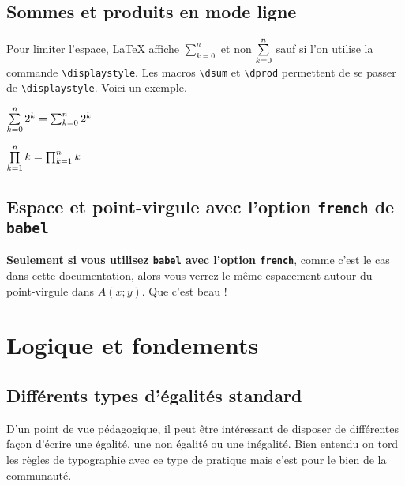 \documentclass[12pt,a4paper]{article}
\newcommand\env[1]{\texttt{#1}}
\newcommand\macro[1]{\env{\textbackslash{}#1}}
\theoremstyle{definition}
\begin{document}

\subsection{Sommes et produits en mode ligne}

Pour limiter l'espace, \LaTeX{} affiche $\sum_{k=0}^{n}$ et non $\sum\limits_{k=0}^{n}$ sauf si l'on utilise la commande \macro{displaystyle}.
Les macros \macro{dsum} et \macro{dprod} permettent de se passer de \macro{displaystyle}.
Voici un exemple.


\begin{latexex}
$\sum\limits_{k=0}^{n} 2^k =
 \sum_{k=0}^{n} 2^k$

$\prod\limits_{k=1}^{n} k =
 \prod_{k=1}^{n} k$
\end{latexex}



\subsection{Espace et point-virgule avec l'option \texttt{french} de \texttt{babel}}

\textbf{Seulement si vous utilisez \texttt{babel} avec l'option \texttt{french}}, comme c'est le cas dans cette documentation, alors vous verrez le même espacement autour du point-virgule dans $A(x;y)$. Que c'est beau !
\section{Logique et fondements}

\subsection{Différents types d'égalités \og standard \fg}

D'un point de vue pédagogique, il peut être intéressant de disposer de différentes façon d'écrire une égalité, une non égalité ou une inégalité.
Bien entendu on tord les règles de typographie avec ce type de pratique mais c'est pour le bien de la communauté.
\end{document}

